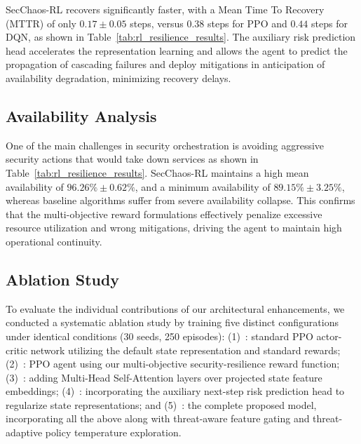 \documentclass[pdflatex,sn-mathphys-num]{sn-jnl}%
\theoremstyle{thmstyleone}%
\theoremstyle{thmstyletwo}%
\theoremstyle{thmstylethree}%
\begin{document}
	SecChaos-RL recovers significantly faster, with a Mean Time To Recovery (MTTR) of only $0.17 \pm 0.05$ steps, versus $0.38$ steps for PPO and $0.44$ steps for DQN, as shown in Table~\ref{tab:rl_resilience_results}. The auxiliary risk prediction head accelerates the representation learning and allows the agent to predict the propagation of cascading failures and deploy mitigations in anticipation of availability degradation, minimizing recovery delays.
	
	\subsection{Availability Analysis}
	
	One of the main challenges in security orchestration is avoiding aggressive security actions that would take down services as shown in Table~\ref{tab:rl_resilience_results}. SecChaos-RL maintains a high mean availability of $96.26\% \pm 0.62\%$, and a minimum availability of $89.15\% \pm 3.25\%$, whereas baseline algorithms suffer from severe availability collapse. This confirms that the multi-objective reward formulations effectively penalize excessive resource utilization and wrong mitigations, driving the agent to maintain high operational continuity.
	
	\subsection{Ablation Study}
	
	To evaluate the individual contributions of our architectural enhancements, we conducted a systematic ablation study by training five distinct configurations under identical conditions (30 seeds, 250 episodes): (1)~: standard PPO actor-critic network utilizing the default state representation and standard rewards; (2)~: PPO agent using our multi-objective security-resilience reward function; (3)~: adding Multi-Head Self-Attention layers over projected state feature embeddings; (4)~: incorporating the auxiliary next-step risk prediction head to regularize state representations; and (5)~: the complete proposed model, incorporating all the above along with threat-aware feature gating and threat-adaptive policy temperature exploration.
	
\end{document}
